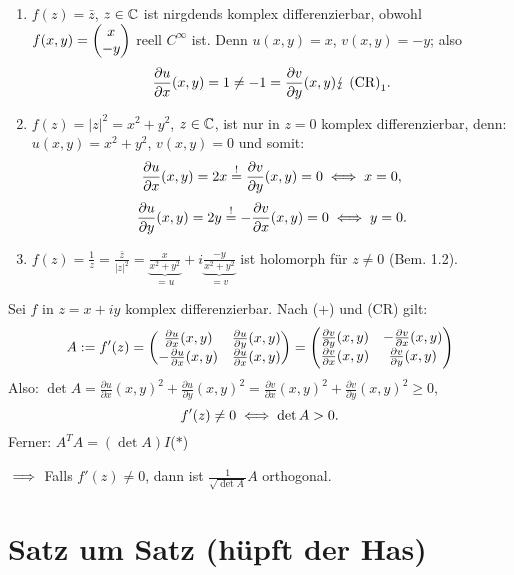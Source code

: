 \documentclass[a4paper,twoside,DIV15,BCOR12mm]{scrbook}
\begin{document}
\begin{bsp}
\begin{enumerate}
\item $f(z) = \bar{z}$, $z\in\mathbb{C}$ ist nirgdends komplex differenzierbar, obwohl $f(x,y) = \left(\!\!\!\begin{array}{c}x\\-y\end{array}\!\!\!\right)$ reell $C^\infty$ ist. Denn $u(x,y) = x$, $v(x,y) = -y$; also 
\[\frac{\partial u}{\partial x}(x,y) = 1 \neq -1 = \frac{\partial v}{\partial y}(x,y) \lightning\text{ (CR)}_1.\]
\item $f(z) = |z|^2 = x^2 + y^2$, $z\in\mathbb{C}$, ist nur in $z=0$ komplex differenzierbar, denn: $u(x,y) = x^2+y^2$, $v(x,y) = 0$ und somit:
\[\frac{\partial u}{\partial x}(x,y) = 2x \stackrel{!}{=} \frac{\partial v}{\partial y}(x,y) = 0 \iff x=0,\]
\[\frac{\partial u}{\partial y}(x,y) = 2y \stackrel{!}{=} -\frac{\partial v}{\partial x}(x,y) = 0 \iff y=0.\]
\item $\displaystyle f(z) = \frac{1}{z} = \frac{\bar{z}}{|z|^2} = \underbrace{\frac{x}{x^2+y^2}}_{=u} + i\underbrace{\frac{-y}{x^2+y^2}}_{=v}$ ist holomorph für $z\neq 0$ (Bem. 1.2). %
\end{enumerate}
\end{bsp}

\begin{bem} Sei $f$ in $z = x+iy$ komplex differenzierbar. Nach (+) und (CR) gilt:
\begin{equation}
A \da f'(z) = \left(\!\!\!\begin{array}{c c}\frac{\partial u}{\partial x}(x,y)&\frac{\partial u}{\partial y}(x,y)\\-\frac{\partial u}{\partial x}(x,y)&\frac{\partial u}{\partial x}(x,y)\end{array}\!\!\!\right) = \left(\!\!\!\begin{array}{c c}\frac{\partial v}{\partial y}(x,y)&-\frac{\partial v}{\partial x}(x,y)\\\frac{\partial v}{\partial x}(x,y)&\frac{\partial v}{\partial y}(x,y)\end{array}\!\!\!\right)
\end{equation}
Also: $\displaystyle \det A = \frac{\partial u}{\partial x}(x,y)^2 + \frac{\partial u}{\partial y}(x,y)^2 = \frac{\partial v}{\partial x}(x,y)^2 + \frac{\partial v}{\partial y}(x,y)^2 \geq 0$,
\[f'(z) \neq 0 \iff \det A > 0.\]
Ferner: $A^TA = (\det A)I$\hfill($\ast$)

\noindent$\implies$ Falls $f'(z) \neq 0$, dann ist $\frac{1}{\sqrt{\det A}}A$ orthogonal.
\end{bem}



\chapter{Satz um Satz (hüpft der Has)}

\renewcommand{\indexname}{Stichwortverzeichnis}
\printindex
\end{document}
